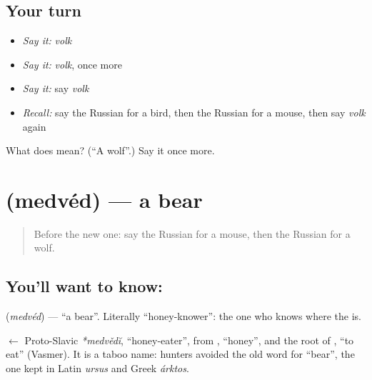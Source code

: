 \subsection*{Your turn}
\begin{itemize}
\raggedright
  \item \emph{Say it:} \emph{volk}
  \item \emph{Say it:} \emph{volk}, once more
  \item \emph{Say it:} say \emph{volk}
  \item \emph{Recall:} say the Russian for a bird, then the Russian for a mouse, then say \emph{volk} again
\end{itemize}

\begin{tcolorbox}[breakable,colback=teal!4,colframe=teal!35!black,title={Before you move on}]
What does  mean? (\textquotedblleft{}A wolf\textquotedblright{}.) Say it once more.
\end{tcolorbox}
\section[\texorpdfstring{\ru{медведь} (medvéd)}{медведь (medvéd)}]{ (medvéd) — a bear}

\label{lesson:RU-C61-bear}



\begin{quote}
Before the new one: say the Russian for a mouse, then the Russian for a wolf.
\end{quote}

\subsection*{You'll want to know: }
\textbf{} (\emph{medvéd}) — \textquotedblleft{}a bear\textquotedblright{}. Literally \textquotedblleft{}honey-knower\textquotedblright{}: the one who knows where the \textbf{} is.

\begin{cousinweb}
\textbf{} $\leftarrow$ Proto-Slavic \emph{*medvědĭ}, \textquotedblleft{}honey-eater\textquotedblright{}, from \emph{}, \textquotedblleft{}honey\textquotedblright{}, and the root of \emph{}, \textquotedblleft{}to eat\textquotedblright{} (Vasmer). It is a taboo name: hunters avoided the old word for \textquotedblleft{}bear\textquotedblright{}, the one kept in Latin \emph{ursus} and Greek \emph{árktos}.
\end{cousinweb}

